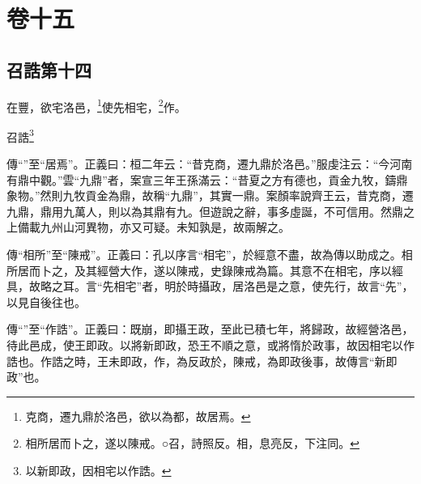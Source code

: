 

\chapter{卷十五}


\section{召誥第十四}


在豐，欲宅洛邑，\footnote{克商，遷九鼎於洛邑，欲以為都，故居焉。}使先相宅，\footnote{相所居而卜之，遂以陳戒。○召，詩照反。相，息亮反，下注同。}作。

召誥\footnote{以新即政，因相宅以作誥。}


{\noindent\zhuan{}\fzbyks 傳“”至“居焉”。正義曰：桓二年云：“昔克商，遷九鼎於洛邑。”服虔注云：“今河南有鼎中觀。”雲“九鼎”者，案宣三年王孫滿云：“昔夏之方有德也，貢金九牧，鑄鼎象物。”然則九牧貢金為鼎，故稱“九鼎”，其實一鼎。案顏率說齊王云，昔克商，遷九鼎，鼎用九萬人，則以為其鼎有九。但遊說之辭，事多虛誕，不可信用。然鼎之上備載九州山河異物，亦又可疑。未知孰是，故兩解之。 \par}

{\noindent\zhuan{}\fzbyks 傳“相所”至“陳戒”。正義曰：孔以序言“相宅”，於經意不盡，故為傳以助成之。相所居而卜之，及其經營大作，遂以陳戒，史錄陳戒為篇。其意不在相宅，序以經具，故略之耳。言“先相宅”者，明於時攝政，居洛邑是之意，使先行，故言“先”，以見自後往也。 \par}

{\noindent\zhuan{}\fzbyks 傳“”至“作誥”。正義曰：既崩，即攝王政，至此已積七年，將歸政，故經營洛邑，待此邑成，使王即政。以將新即政，恐王不順之意，或將惰於政事，故因相宅以作誥也。作誥之時，王未即政，作，為反政於，陳戒，為即政後事，故傳言“新即政”也。 \par}

